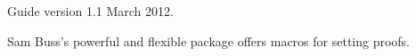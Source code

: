 \documentclass[11pt]{article}
\begin{document}
\begin{center}
	\small{Guide version 1.1 March 2012.}
\end{center}
\newpage
Sam Buss's powerful and flexible package offers macros for setting proofs.
\end{document}
